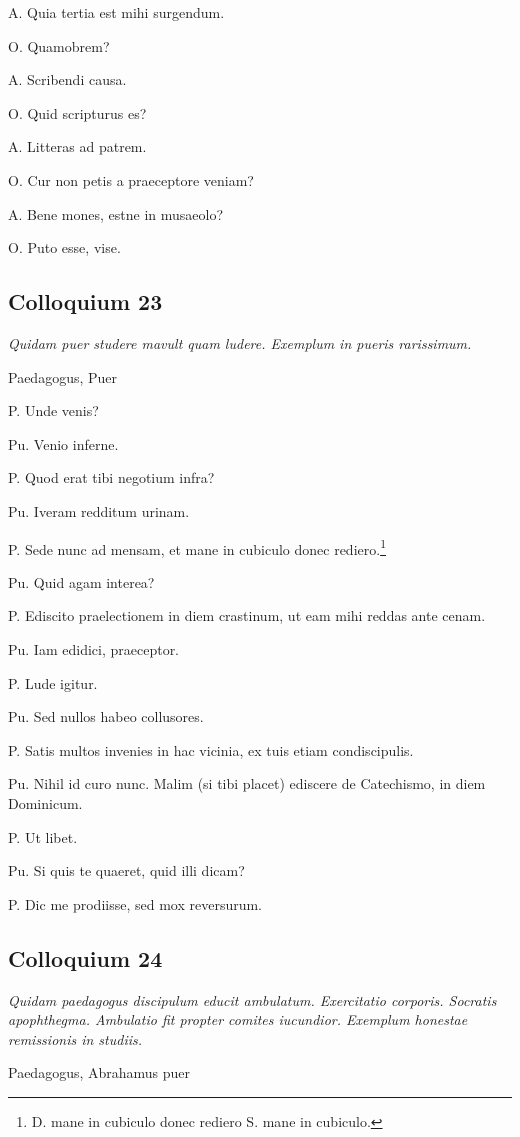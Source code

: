 \documentclass{article}
\begin{document}
A. Quia tertia est mihi surgendum.

O. Quamobrem?

A. Scribendi causa.

O. Quid scripturus es?

A. Litteras ad patrem.
 
O. Cur non petis a praeceptore veniam?

A. Bene mones, estne in musaeolo?

O. Puto esse, vise.

\subsection{Colloquium 23}
\emph{Quidam puer studere mavult quam ludere. Exemplum in pueris rarissimum.}

Paedagogus, Puer

P. Unde venis?

Pu. Venio inferne.

 
P. Quod erat tibi negotium infra?

Pu. Iveram redditum urinam.

P. Sede nunc ad mensam, et mane in cubiculo donec rediero.\footnote{D. mane in cubiculo donec rediero S. mane in cubiculo.}

Pu. Quid agam interea?

P. Ediscito praelectionem in diem crastinum, ut eam mihi reddas ante cenam.

Pu. Iam edidici, praeceptor.

P. Lude igitur.

Pu. Sed nullos habeo collusores.

P. Satis multos invenies in hac vicinia, ex tuis etiam condiscipulis.

Pu. Nihil id curo nunc. Malim (si tibi placet) ediscere de Catechismo, in diem Dominicum.

P. Ut libet.

Pu. Si quis te quaeret, quid illi dicam?

P. Dic me prodiisse, sed mox reversurum.

\subsection{Colloquium 24}
\emph{Quidam paedagogus discipulum educit ambulatum. Exercitatio corporis. Socratis apophthegma. Ambulatio fit propter comites iucundior. Exemplum honestae remissionis in studiis.}

Paedagogus, Abrahamus puer
\end{document}
